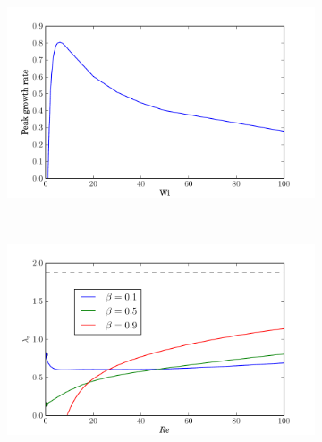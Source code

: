 \documentclass{jfm}
\begin{document}
\begin{figure}
    \centering
    \begin{subfigure}[b]{0.48\textwidth}
	\centering
    \includegraphics[width=\textwidth]{KH_purely_elastic}
    \caption{}
    \label{fig:KH_purely_elastic}
\end{subfigure}
~
\begin{subfigure}[b]{0.48\textwidth}
    \centering
    \includegraphics[width=\textwidth]{KH_low_Wi_vary_Re}
    \caption{}
    \label{fig:KH_reduce_Re}
\end{subfigure}


\end{figure}
\end{document}
